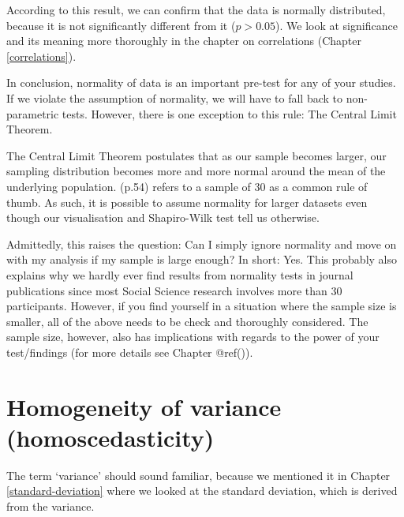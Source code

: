 \documentclass[
]{book}
\newenvironment{Shaded}{\begin{snugshade}}{\end{snugshade}}
\newcommand{\DocumentationTok}[1]{\textcolor[rgb]{0.56,0.35,0.01}{\textbf{\textit{#1}}}}
\newcommand{\FunctionTok}[1]{\textcolor[rgb]{0.00,0.00,0.00}{#1}}
\newcommand{\NormalTok}[1]{#1}
\newcommand{\SpecialCharTok}[1]{\textcolor[rgb]{0.00,0.00,0.00}{#1}}
\begin{document}
\begin{Shaded}
\end{Shaded}

According to this result, we can confirm that the data is normally distributed, because it is not significantly different from it (\(p > 0.05\)). We look at significance and its meaning more thoroughly in the chapter on correlations (Chapter \ref{correlations}).

In conclusion, normality of data is an important pre-test for any of your studies. If we violate the assumption of normality, we will have to fall back to non-parametric tests. However, there is one exception to this rule: The Central Limit Theorem.

The Central Limit Theorem postulates that as our sample becomes larger, our sampling distribution becomes more and more normal around the mean of the underlying population. \citet{field2013discovering} (p.54) refers to a sample of 30 as a common rule of thumb. As such, it is possible to assume normality for larger datasets even though our visualisation and Shapiro-Wilk test tell us otherwise.

Admittedly, this raises the question: Can I simply ignore normality and move on with my analysis if my sample is large enough? In short: Yes. This probably also explains why we hardly ever find results from normality tests in journal publications since most Social Science research involves more than 30 participants. However, if you find yourself in a situation where the sample size is smaller, all of the above needs to be check and thoroughly considered. The sample size, however, also has implications with regards to the power of your test/findings (for more details see Chapter @ref()).

\hypertarget{homogeneity-of-variance}{%
\section{Homogeneity of variance (homoscedasticity)}\label{homogeneity-of-variance}}

The term `variance' should sound familiar, because we mentioned it in Chapter \ref{standard-deviation} where we looked at the standard deviation, which is derived from the variance.
\end{document}
